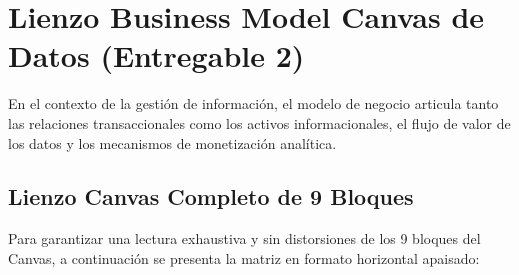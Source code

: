 \documentclass[12pt,a4paper]{report}
\begin{document}
\chapter{Lienzo Business Model Canvas de Datos (Entregable 2)}

En el contexto de la gestión de información, el modelo de negocio articula tanto las relaciones transaccionales como los activos informacionales, el flujo de valor de los datos y los mecanismos de monetización analítica.

\section{Lienzo Canvas Completo de 9 Bloques}

Para garantizar una lectura exhaustiva y sin distorsiones de los 9 bloques del Canvas, a continuación se presenta la matriz en formato horizontal apaisado:
\end{document}
